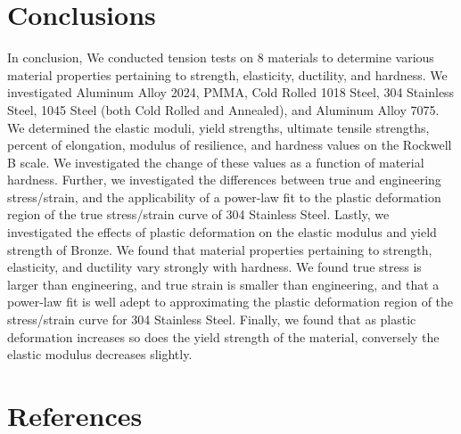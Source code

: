 \documentclass{article}
\begin{document}
\section{Conclusions}
In conclusion, We conducted tension tests on 8 materials to determine various material properties pertaining to strength, elasticity, ductility, and hardness. We investigated Aluminum Alloy 2024, PMMA, Cold Rolled 1018 Steel, 304 Stainless Steel, 1045 Steel (both Cold Rolled and Annealed), and Aluminum Alloy 7075. We determined the elastic moduli, yield strengths, ultimate tensile strengths, percent of elongation, modulus of resilience, and hardness values on the Rockwell B scale. We investigated the change of these values as a function of material hardness. Further, we investigated the differences between true and engineering stress/strain, and the applicability of a power-law fit to the plastic deformation region of the true stress/strain curve of 304 Stainless Steel. Lastly, we investigated the effects of plastic deformation on the elastic modulus and yield strength of Bronze. We found that material properties pertaining to strength, elasticity, and ductility vary strongly with hardness. We found true stress is larger than engineering, and true strain is smaller than engineering, and that a power-law fit is well adept to approximating the plastic deformation region of the stress/strain curve for 304 Stainless Steel. Finally, we found that as plastic deformation increases so does the yield strength of the material, conversely the elastic modulus decreases slightly. 

\section{References}
\printbibliography[heading=none]
\end{document}
